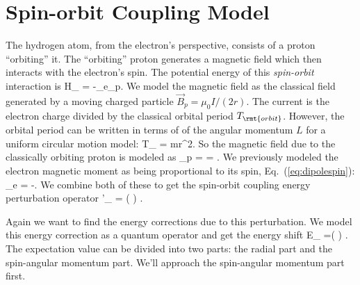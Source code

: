 \section{Spin-orbit Coupling Model}
\label{sec:socoupling}
\begin{marginfigure}
\centering
{}
\end{marginfigure}
The hydrogen atom, from the electron's perspective, consists of a proton ``orbiting'' it. The ``orbiting'' proton generates a magnetic field which then interacts with the electron's spin. The potential energy of this {\em spin-orbit} interaction is
\beq
H_ = -\vec{\mu}_e\cdot{}_p.
\eeq
We model the magnetic field as the classical field generated by a moving charged particle $\vec{B}_p = \mu_0 I/(2r)$. The current is the electron charge divided by the classical orbital period $T_\rmt{orbit}$. However, the orbital period can be written in terms of of the angular momentum $L$ for a uniform circular motion model:
\beq
T_ = mr^2.
\eeq
So the magnetic field due to the classically orbiting proton is modeled as
\beq
{}_p =  = .
\eeq{}%
We previously modeled the electron magnetic moment as being proportional to its spin, Eq.~(\ref{eq:dipolespin}):
\beq
\vec{\mu}_e = -.
\eeq
We combine both of these to get the spin-orbit coupling energy perturbation operator
\beq
{}'_ = \left( \right) \cdot{}.
\eeq{}

Again we want to find the energy corrections due to this perturbation. We model this energy correction as a quantum operator and get the energy shift
\beq
E_ =\left( \right) .
\label{eq:esofirst}
\eeq
The expectation value can be divided into two parts: the radial part and the spin-angular momentum part. We'll approach the spin-angular momentum part first.

